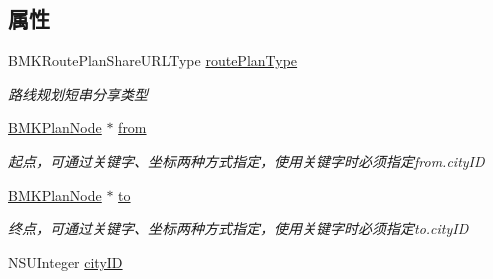 \subsection*{属性}
\begin{DoxyCompactItemize}
\item 
\hypertarget{interface_b_m_k_route_plan_share_u_r_l_option_aee123099a76a67928348a5ea92f8d2c8}{}B\+M\+K\+Route\+Plan\+Share\+U\+R\+L\+Type \hyperlink{interface_b_m_k_route_plan_share_u_r_l_option_aee123099a76a67928348a5ea92f8d2c8}{route\+Plan\+Type}\label{interface_b_m_k_route_plan_share_u_r_l_option_aee123099a76a67928348a5ea92f8d2c8}

\begin{DoxyCompactList}\small\item\em 路线规划短串分享类型 \end{DoxyCompactList}\item 
\hypertarget{interface_b_m_k_route_plan_share_u_r_l_option_a9f38494535c2a6726f2c015315767ccd}{}\hyperlink{interface_b_m_k_plan_node}{B\+M\+K\+Plan\+Node} $\ast$ \hyperlink{interface_b_m_k_route_plan_share_u_r_l_option_a9f38494535c2a6726f2c015315767ccd}{from}\label{interface_b_m_k_route_plan_share_u_r_l_option_a9f38494535c2a6726f2c015315767ccd}

\begin{DoxyCompactList}\small\item\em 起点，可通过关键字、坐标两种方式指定，使用关键字时必须指定from.\+city\+I\+D \end{DoxyCompactList}\item 
\hypertarget{interface_b_m_k_route_plan_share_u_r_l_option_a9e6eafbc9548e80067b79811a94919c1}{}\hyperlink{interface_b_m_k_plan_node}{B\+M\+K\+Plan\+Node} $\ast$ \hyperlink{interface_b_m_k_route_plan_share_u_r_l_option_a9e6eafbc9548e80067b79811a94919c1}{to}\label{interface_b_m_k_route_plan_share_u_r_l_option_a9e6eafbc9548e80067b79811a94919c1}

\begin{DoxyCompactList}\small\item\em 终点，可通过关键字、坐标两种方式指定，使用关键字时必须指定to.\+city\+I\+D \end{DoxyCompactList}\item 
\hypertarget{interface_b_m_k_route_plan_share_u_r_l_option_ae445622390cc1f33f0f4e860e6c7239f}{}N\+S\+U\+Integer \hyperlink{interface_b_m_k_route_plan_share_u_r_l_option_ae445622390cc1f33f0f4e860e6c7239f}{city\+I\+D}\label{interface_b_m_k_route_plan_share_u_r_l_option_ae445622390cc1f33f0f4e860e6c7239f}


\end{DoxyCompactItemize}
